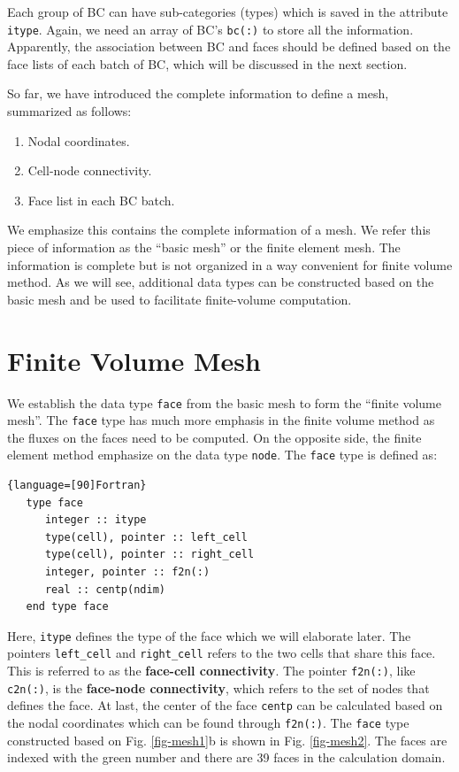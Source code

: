 \documentclass[11pt, letterpaper]{report}
\begin{document}
Each group of BC can have sub-categories (types) which is saved in the attribute \verb+itype+.
Again, we need an array of BC's \verb+bc(:)+ to store all the information. Apparently, the
association between BC and faces should be defined based on the face lists of each batch of BC,
which will be discussed in the next section.
\paraspace

So far, we have introduced the complete information to define a mesh, summarized as follows:

\begin{enumerate}
   \item Nodal coordinates.
   \item Cell-node connectivity.
   \item Face list in each BC batch.
\end{enumerate}

We emphasize this contains the complete information of a mesh. We refer this piece of information as
the ``basic mesh'' or the finite element mesh. The information is complete but is not organized in a
way convenient for finite volume method. As we will see, additional data types can be constructed
based on the basic mesh and be used to facilitate finite-volume computation. 
\paraspace

\section{Finite Volume Mesh} \label{c1s2}

We establish the data type \verb+face+ from the basic mesh to form the ``finite volume mesh''. The
\verb+face+ type has much more emphasis in the finite volume method as the fluxes on the faces need
to be computed. On the opposite side, the finite element method emphasize on the data type
\verb+node+. The \verb+face+ type is defined as:

\begin{lstlisting}{language=[90]Fortran}
   type face
      integer :: itype
      type(cell), pointer :: left_cell
      type(cell), pointer :: right_cell
      integer, pointer :: f2n(:)
      real :: centp(ndim)
   end type face
\end{lstlisting}

Here, \verb+itype+ defines the type of the face which we will elaborate later. The pointers
\verb+left_cell+ and \verb+right_cell+ refers to the two cells that share this face. This is
referred to as the {\bf face-cell connectivity}. The pointer \verb+f2n(:)+, like \verb+c2n(:)+, is
the {\bf face-node connectivity}, which refers to the set of nodes that defines the face. At last,
the center of the face \verb+centp+ can be calculated based on the nodal coordinates which can be
found through \verb+f2n(:)+. The \verb+face+ type constructed based on Fig. \ref{fig-mesh1}b is
shown in Fig. \ref{fig-mesh2}. The faces are indexed with the green number and there are 39 faces in
the calculation domain.
\end{document}
